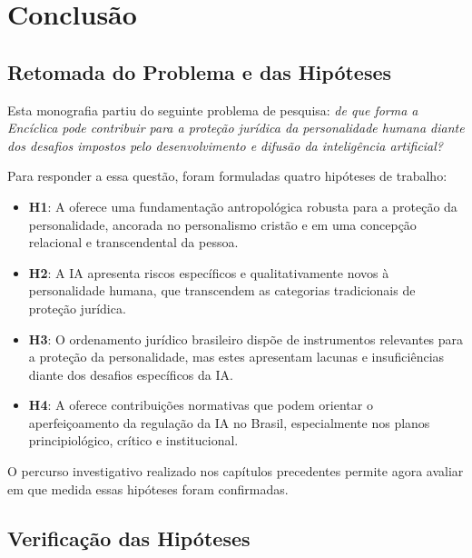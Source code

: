 
\chapter{Conclusão}
\label{cap:conclusao}

\section{Retomada do Problema e das Hipóteses}
\label{sec:retomada-hipoteses}

Esta monografia partiu do seguinte problema de pesquisa: \textit{de que forma a Encíclica \MH{} pode contribuir para a proteção jurídica da personalidade humana diante dos desafios impostos pelo desenvolvimento e difusão da inteligência artificial?}

Para responder a essa questão, foram formuladas quatro hipóteses de trabalho:

\begin{itemize}
    \item \textbf{H1}: A \MH{} oferece uma fundamentação antropológica robusta para a proteção da personalidade, ancorada no personalismo cristão e em uma concepção relacional e transcendental da pessoa.
    \item \textbf{H2}: A IA apresenta riscos específicos e qualitativamente novos à personalidade humana, que transcendem as categorias tradicionais de proteção jurídica.
    \item \textbf{H3}: O ordenamento jurídico brasileiro dispõe de instrumentos relevantes para a proteção da personalidade, mas estes apresentam lacunas e insuficiências diante dos desafios específicos da IA.
    \item \textbf{H4}: A \MH{} oferece contribuições normativas que podem orientar o aperfeiçoamento da regulação da IA no Brasil, especialmente nos planos principiológico, crítico e institucional.
\end{itemize}

O percurso investigativo realizado nos capítulos precedentes permite agora avaliar em que medida essas hipóteses foram confirmadas.

\section{Verificação das Hipóteses}
\label{sec:verificacao-hipoteses}

